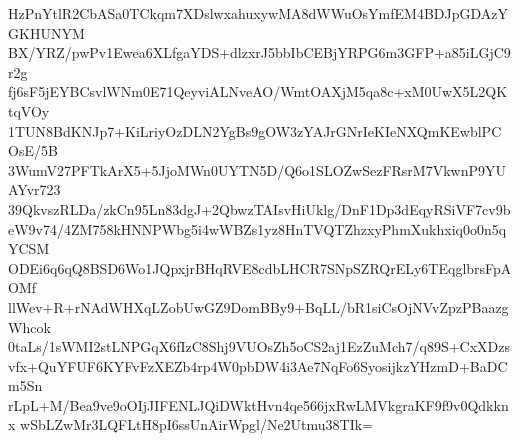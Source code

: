 HzPnYtlR2CbASa0TCkqm7XDslwxahuxywMA8dWWuOsYmfEM4BDJpGDAzYGKHUNYM
BX/YRZ/pwPv1Ewea6XLfgaYDS+dlzxrJ5bbIbCEBjYRPG6m3GFP+a85iLGjC9r2g
fj6sF5jEYBCsvlWNm0E71QeyviALNveAO/WmtOAXjM5qa8c+xM0UwX5L2QKtqVOy
1TUN8BdKNJp7+KiLriyOzDLN2YgBs9gOW3zYAJrGNrIeKIeNXQmKEwblPCOsE/5B
3WumV27PFTkArX5+5JjoMWn0UYTN5D/Q6o1SLOZwSezFRsrM7VkwnP9YUAYvr723
39QkvszRLDa/zkCn95Ln83dgJ+2QbwzTAIsvHiUklg/DnF1Dp3dEqyRSiVF7cv9b
eW9v74/4ZM758kHNNPWbg5i4wWBZs1yz8HnTVQTZhzxyPhmXukhxiq0o0n5qYCSM
ODEi6q6qQ8BSD6Wo1JQpxjrBHqRVE8cdbLHCR7SNpSZRQrELy6TEqglbrsFpAOMf
llWev+R+rNAdWHXqLZobUwGZ9DomBBy9+BqLL/bR1siCsOjNVvZpzPBaazgWhcok
0taLs/1sWMI2stLNPGqX6fIzC8Shj9VUOsZh5oCS2aj1EzZuMch7/q89S+CxXDzs
vfx+QuYFUF6KYFvFzXEZb4rp4W0pbDW4i3Ae7NqFo6SyosijkzYHzmD+BaDCm5Sn
rLpL+M/Bea9ve9oOIjJIFENLJQiDWktHvn4qe566jxRwLMVkgraKF9f9v0Qdkknx
wSbLZwMr3LQFLtH8pI6ssUnAirWpgl/Ne2Utmu38TIk=
